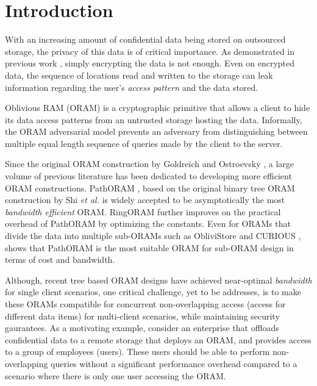   \section{Introduction}
  \label{oram.intro}

  With an increasing amount of confidential data being stored on outsourced 
  storage, 
  the privacy of this data is of critical importance. As demonstrated in previous 
  work \cite{accesspatternleak}, 
  simply encrypting the data is not enough. Even on encrypted data, the sequence 
  of locations read and written to 
  the storage can leak information regarding the user's {\em access pattern} and 
  the data stored. 

  Oblivious RAM (ORAM) is a cryptographic primitive that allows a client to hide 
  its data access patterns from 
  an untrusted storage hosting the data. Informally, the ORAM adversarial model 
  prevents an adversary from distinguishing 
  between multiple equal length sequence of queries made by the client to the 
  server.

  Since the original ORAM construction by Goldreich and Ostroevsky 
  \cite{goldreich}, a large volume 
  of previous literature 
  \cite{oram_cuckoohashing,bforam,privatefs,binarytreeoram,pathoram,ringoram} has 
  been dedicated to developing 
  more efficient ORAM constructions. PathORAM \cite{pathoram}, based on the 
  original binary tree ORAM construction by 
  Shi {\em et al.} \cite{binarytreeoram} is widely accepted to be asymptotically 
  the most {\em bandwidth efficient} ORAM. RingORAM \cite{ringoram} 
  further improves on the practical overhead of PathORAM \cite{pathoram} by 
  optimizing the constants. Even for ORAMs that divide the data into 
  multiple sub-ORAMs such as ObliviStore \cite{oblivistore} and CURIOUS 
  \cite{curious}, \cite{curious} shows that PathORAM \cite{pathoram} is the most 
  suitable ORAM for sub-ORAM design in terms of cost and bandwidth.

  Although, recent tree based ORAM designs have achieved near-optimal {\em bandwidth} 
  for single client scenarios, 
  one critical challenge, yet to be addresses, is to make
  these ORAMs compatible for concurrent non-overlapping access (access for different data items)
  for multi-client scenarios, while maintaining security gaurantees. 
  As a motivating example, consider an enterprise that offloads confidential 
  data to a remote storage that deploys an ORAM, and provides access
  to a group of employees (users). 
  These users should be able to perform non-overlapping queries 
  without a significant performance overhead compared to a scenario where there is 
  only one user accessing the ORAM.

